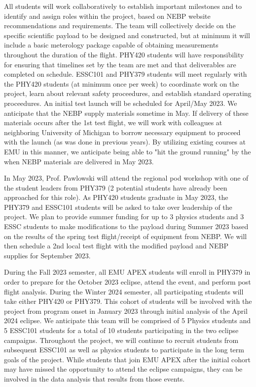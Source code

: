 \documentclass[12pt]{article}
\begin{document}
All students will work collaboratively to establish important milestones and to identify
and assign roles within the project, based on NEBP website recommendations and requirements.
The team will collectively decide on the specific scientific payload to be designed and constructed,
but at minimum it will include a basic meterology package capable of obtaining
measurements throughout the duration of the flight.
PHY420 students will have responsibility for ensuring that
timelines set by the team are met and that deliverables are completed on schedule.
ESSC101 and PHY379 students will
meet regularly with the PHY420 students (at minimum once per week) to coordinate work on the
project, learn about relevant safety proceedures, and establish standard operating proceedures.
An initial test launch will be scheduled for April/May 2023.
We anticipate that the NEBP supply materials sometime in May. If
delivery of these materials occurs after the 1st test flight, we will work with
colleagues at neighboring University of Michigan to borrow necessary equipment
to proceed with the launch (as was done in previous years). By utilizing existing courses
at EMU in this manner, we anticipate being able to "hit the ground running" by the
when NEBP materials are delivered in May 2023.

In May 2023, Prof. Pawlowski will attend the regional pod workshop with one of
the student leaders from PHY379 (2 potential students have already been approached
for this role).
As PHY420 students graduate in May 2023, the PHY379 and ESSC101 students will be
asked to take over leadership of the project. We plan to provide
summer funding for up to 3 physics students and 3 ESSC students to make modifications to the
payload during Summer 2023 based on the results of the spring test flight/receipt
of equipment from NEBP.
We will then schedule a 2nd local test flight with the modified payload and
NEBP supplies for September
2023.

 During the Fall 2023 semester, all EMU APEX students will enroll in PHY379 in order
 to prepare for the October 2023 eclipse, attend the event, and perform post flight
 analysis. During the Winter 2024 semester, all participating students will 
 take either PHY420 or PHY379. This cohort of students
will be involved with the project from program onset in January 2023 through initial analysis
of the April 2024 eclipse. We anticipate this
team will be comprised of 5 Physics students and 5 ESSC101 students for a total
of 10 students participating in the two eclipse campaigns. Throughout the 
project, we will continue to recruit students from subsequent ESSC101 as well as 
physics students to participate in the long term goals of the project. While students that 
join EMU APEX after the initial cohort may have missed the opportunity to 
attend the eclipse campaigns, they can be involved in the data analysis 
that results from those events.
\end{document}
